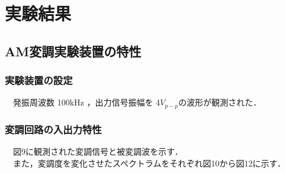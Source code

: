 \newpage
\section{実験結果}
\subsection{AM変調実験装置の特性}
\subsubsection{実験装置の設定}
　発振周波数 100kHz ，出力信号振幅を 4$V_{p-p}$の波形が観測された．\\

\subsubsection{変調回路の入出力特性}
　図9に観測された変調信号と被変調波を示す．\\
　また，変調度を変化させたスペクトラムをそれぞれ図10から図12に示す．

